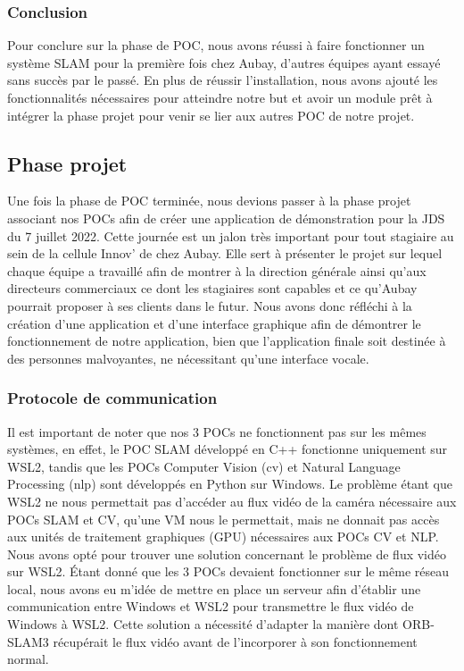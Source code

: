 \documentclass[11pt]{article}
\begin{document}
      \subsubsection{Conclusion}
        Pour conclure sur la phase de POC, nous avons réussi à faire fonctionner un système SLAM pour la première fois chez Aubay, d'autres
        équipes ayant essayé sans succès par le passé. En plus de réussir l'installation, nous avons ajouté les fonctionnalités nécessaires
        pour atteindre notre but et avoir un module prêt à intégrer la phase projet pour venir se lier aux autres POC de notre projet.

    \subsection{Phase projet}
      Une fois la phase de POC terminée, nous devions passer à la phase projet associant nos POCs
      afin de créer une application de démonstration pour la JDS du 7 juillet 2022. Cette journée est un jalon très important
      pour tout stagiaire au sein de la cellule Innov' de chez Aubay. Elle sert à présenter le projet sur lequel chaque équipe a travaillé
      afin de montrer à la direction générale ainsi qu'aux directeurs commerciaux ce dont les stagiaires sont capables et ce qu'Aubay pourrait
      proposer à ses clients dans le futur. Nous avons donc réfléchi à la création d'une application et d'une
      interface graphique afin de démontrer le fonctionnement de notre application, bien que l'application finale soit destinée 
      à des personnes malvoyantes, ne nécessitant qu'une interface vocale.

      \subsubsection{Protocole de communication}
        Il est important de noter que nos 3 POCs ne fonctionnent pas sur les mêmes systèmes, en effet, le POC SLAM développé en C++
        fonctionne uniquement sur WSL2, tandis que les POCs Computer Vision (\acrshort{cv}) et Natural Language Processing (\acrshort{nlp}) 
        sont développés en Python sur Windows. Le problème étant que WSL2 ne nous permettait pas d'accéder au flux vidéo de la caméra nécessaire 
        aux POCs SLAM et CV, qu'une VM nous le permettait, mais ne donnait pas accès aux unités de traitement graphiques (GPU) nécessaires aux 
        POCs CV et NLP. Nous avons opté pour 
        trouver une solution concernant le problème de flux vidéo sur WSL2. Étant donné que les 3 POCs devaient fonctionner sur le même réseau 
        local, nous avons eu m'idée de mettre en place un serveur afin d'établir une communication entre Windows et WSL2 pour transmettre le flux 
        vidéo de Windows à WSL2. Cette solution a nécessité d'adapter la manière dont ORB-SLAM3 récupérait le flux vidéo avant de l'incorporer à 
        son fonctionnement normal.
\end{document}
